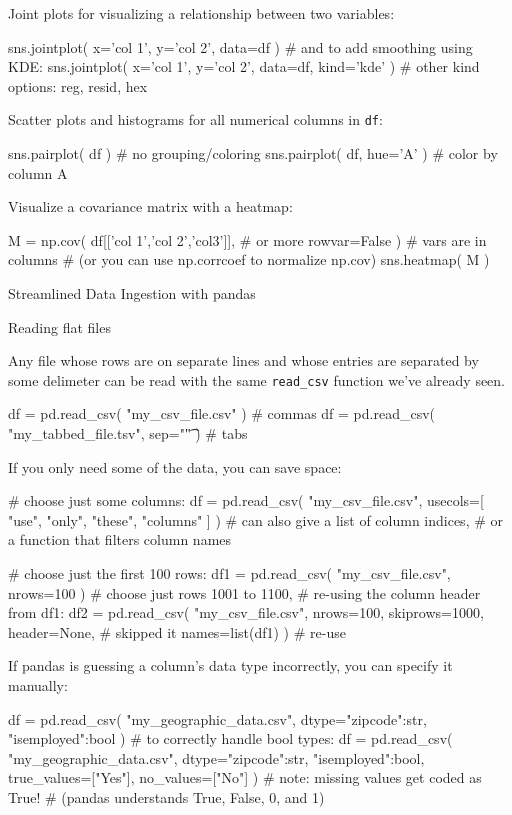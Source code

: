 \documentclass[a4paper,landscape,columns=3]{cheatsheet}
\def\chap#1{\vspace{5mm}\begin{tcolorbox}[colback=red!5!white,colframe=red!75!black,leftrule=3mm]
    \Large #1
\end{tcolorbox}}
\def\sect#1{\begin{tcolorbox}[colback=blue!5!white,colframe=blue!75!black,size=title,leftrule=2mm]
    \large #1
\end{tcolorbox}}
\begin{document}
Joint plots for visualizing a relationship between two variables:
\begin{python}
sns.jointplot( x='col 1', y='col 2', data=df )
# and to add smoothing using KDE:
sns.jointplot( x='col 1', y='col 2', data=df,
               kind='kde' )
# other kind options: reg, resid, hex
\end{python}

Scatter plots and histograms for all numerical columns in \lstinline{df}:
\begin{python}
sns.pairplot( df )           # no grouping/coloring
sns.pairplot( df, hue='A' )  # color by column A
\end{python}

Visualize a covariance matrix with a heatmap:
\begin{python}
M = np.cov( df[['col 1','col 2','col3']], # or more
            rowvar=False )   # vars are in columns
# (or you can use np.corrcoef to normalize np.cov)
sns.heatmap( M )
\end{python}

\chap{Streamlined Data Ingestion with pandas}

\sect{Reading flat files}

Any file whose rows are on separate lines and whose entries are separated by some delimeter can be read with the same \lstinline{read_csv} function we've already seen.
\begin{python}
df = pd.read_csv( "my_csv_file.csv" )   # commas
df = pd.read_csv( "my_tabbed_file.tsv",
                  sep="\t" )            # tabs
\end{python}

If you only need some of the data, you can save space:
\begin{python}
# choose just some columns:
df = pd.read_csv( "my_csv_file.csv", usecols=[
    "use", "only", "these", "columns" ] )
# can also give a list of column indices,
# or a function that filters column names

# choose just the first 100 rows:
df1 = pd.read_csv( "my_csv_file.csv", nrows=100 )
# choose just rows 1001 to 1100,
# re-using the column header from df1:
df2 = pd.read_csv( "my_csv_file.csv",
                   nrows=100, skiprows=1000,
                   header=None,       # skipped it
                   names=list(df1) )  # re-use
\end{python}

If pandas is guessing a column's data type incorrectly, you can specify it manually:
\begin{python}
df = pd.read_csv( "my_geographic_data.csv",
                  dtype={"zipcode":str,
                         "isemployed":bool} )
# to correctly handle bool types:
df = pd.read_csv( "my_geographic_data.csv",
                  dtype={"zipcode":str,
                         "isemployed":bool},
                  true_values=["Yes"],
                  no_values=["No"] )
# note: missing values get coded as True!
# (pandas understands True, False, 0, and 1)
\end{python}
\end{document}
